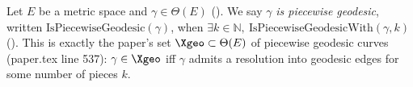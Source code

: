 \begin{definition}
  Let $E$ be a metric space and $\gamma \in \Theta(E)$ (). We say $\gamma$
  \emph{is piecewise geodesic}, written $\mathrm{IsPiecewiseGeodesic}(\gamma)$, when
  $\exists k \in \mathbb{N},\ \mathrm{IsPiecewiseGeodesicWith}(\gamma,k)$
  (). This is exactly the paper's set $\Xgeo \subset \Theta(E)$ of
  piecewise geodesic curves (paper.tex line 537): $\gamma \in \Xgeo$ iff $\gamma$ admits a
  resolution into geodesic edges for some number of pieces $k$.
\end{definition}

